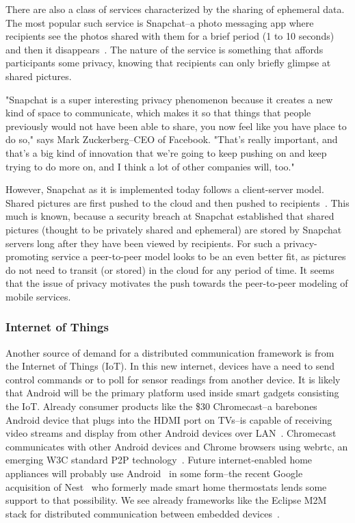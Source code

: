 \documentclass[prodmode]{acmlarge}
\begin{document}
There are also a class of services characterized by the sharing of ephemeral data. The most popular such service is Snapchat--a photo messaging app where recipients see the photos shared with them for a brief period (1 to 10 seconds) and then it disappears~\cite{Snapchat}. The nature of the service is something that affords participants some privacy, knowing that recipients can only briefly glimpse at shared pictures.

"Snapchat is a super interesting privacy phenomenon because it creates a new kind of space to communicate, which makes it so that things that people previously would not have been able to share, you now feel like you have place to do so," says Mark Zuckerberg--CEO of Facebook. "That’s really important, and that’s a big kind of innovation that we’re going to keep pushing on and keep trying to do more on, and I think a lot of other companies will, too."~\cite{Zuckerberg}

However, Snapchat as it is implemented today follows a client-server model. Shared pictures are first pushed to the cloud and then pushed to recipients~\cite{SnapchatHack}. This much is known, because a security breach at Snapchat established that shared pictures (thought to be privately shared and ephemeral) are stored by Snapchat servers long after they have been viewed by recipients. For such a privacy-promoting service a peer-to-peer model looks to be an even better fit, as pictures do not need to transit (or stored) in the cloud for any period of time. It seems that the issue of privacy motivates the push towards the peer-to-peer modeling of mobile services.

\subsubsection{Internet of Things}
Another source of demand for a distributed communication framework is from the Internet of Things (IoT). In this new internet, devices have a need to send control commands or to poll for sensor readings from another device. It is likely that Android will be the primary platform used inside smart gadgets consisting the IoT. Already consumer products like the \$30 Chromecast--a barebones Android device that plugs into the HDMI port on TVs--is capable of receiving video streams and display from other Android devices over LAN~\cite{chromecast}. Chromecast communicates with other Android devices and Chrome browsers using webrtc, an emerging W3C standard P2P technology~\cite{ChromecastWebrtc}. Future internet-enabled home appliances will probably use Android~\cite{AndroidEverywhere} in some form--the recent Google acquisition of Nest~\cite{GoogleNest} who formerly made smart home thermostats lends some support to that possibility. We see already frameworks like the Eclipse M2M  stack for distributed communication between embedded devices~\cite{eclipse_m2m}.
\end{document}
